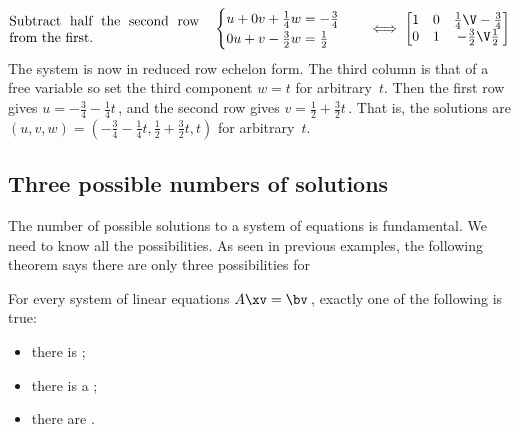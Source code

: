 \begin{example}
\begin{solution}
\begin{align*}
\parbox{0.4\linewidth}{Subtract half the second row from the first.}
\quad&
\begin{cases}
u+0v+\frac14w=-\frac34\\0u+v-\frac32w=\frac12
\end{cases}
&\iff
\begin{bmatrix} 1&0&\frac14\V-\frac34\\0&1&-\frac32\V\frac12 \end{bmatrix}
\end{align*}
The system is now in reduced row echelon form.  
The third column is that of a free variable so set the third component \(w=t\) for arbitrary~\(t\).
Then the first row gives \(u=-\frac34-\frac14t\)\,, and the second row gives \(v=\frac12+\frac32t\)\,.
That is, the solutions are \((u,v,w)=(-\frac34-\frac14t,\frac12+\frac32t,t)\) for arbitrary~\(t\).
\end{solution}
\end{example}




\subsection{Three possible numbers of solutions}
\label{sec:3pns}

The number of possible solutions to a system of equations is fundamental.  
We need to know all the possibilities.
As seen in previous examples, the following theorem says there are only three possibilities for 

\begin{theorem} \label{thm:fred}
For every system of linear equations \(A\xv=\bv\)\,, exactly one of the following is true:
\begin{itemize}
\item there is ;
\item there is a ;
\item there are .
\end{itemize}
\end{theorem}

\begin{comment}
After studying \cref{sec:svdsgs}, this theorem could alternatively be proved directly from the use of the so-called \idx{singular value decomposition} in solving the linear equation \(A\xv=\bv\)\,.
\end{comment}

